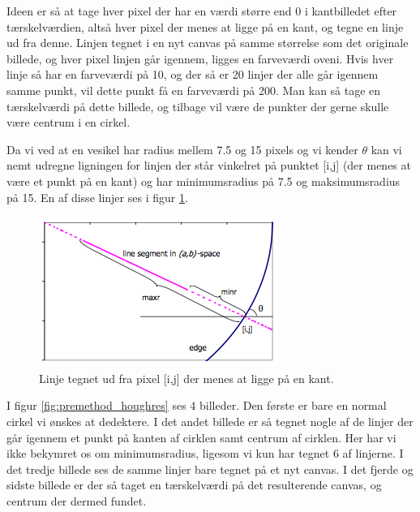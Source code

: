 Ideen er så at tage hver pixel der har en værdi større end 0 i kantbilledet efter tærskelværdien, altså hver pixel der menes at ligge på en kant, og tegne en linje ud fra denne. Linjen tegnet i en nyt canvas på samme størrelse som det originale billede, og hver pixel linjen går igennem, ligges en farveværdi oveni. Hvis hver linje så har en farveværdi på 10, og der så er 20 linjer der alle går igennem samme punkt, vil dette punkt få en farveværdi på 200. Man kan så tage en tærskelværdi på dette billede, og tilbage vil være de punkter der gerne skulle være centrum i en cirkel. 

Da vi ved at en vesikel har radius mellem 7.5 og 15 pixels og vi kender $\theta$ kan vi nemt udregne ligningen for linjen der står vinkelret på punktet [i,j] (der menes at være et punkt på en kant) og har minimumsradius på 7.5 og maksimumsradius på 15. En af disse linjer ses i figur \ref{fig:premethod_houghLines}. 

\begin{figure}[H]
	\centering
	\includegraphics[scale=1]{files/premethod/img/hough_lines.png}
	\caption{Linje tegnet ud fra pixel [i,j] der menes at ligge på en kant.\label{fig:premethod_houghLines}}
\end{figure}

I figur \ref{fig:premethod_houghres} ses 4 billeder. Den første er bare en normal cirkel vi ønskes at dedektere. I det andet billede er så tegnet nogle af de linjer der går igennem et punkt på kanten af cirklen samt centrum af cirklen. Her har vi ikke bekymret os om minimumsradius, ligesom vi kun har tegnet 6 af linjerne. I det tredje billede ses de samme linjer bare tegnet på et nyt canvas. I det fjerde og sidste billede er der så taget en tærskelværdi på det resulterende canvas, og centrum der dermed fundet.

